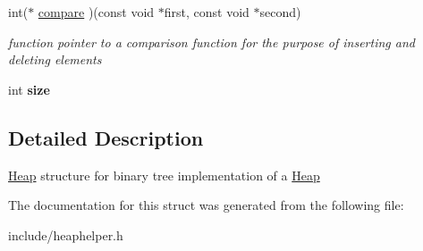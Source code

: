 \begin{DoxyCompactItemize}
\mbox{\label{structHeap_ab11468cee0bf82183a92cf2fa8bab107}} 
int($\ast$ \hyperlink{structHeap_ab11468cee0bf82183a92cf2fa8bab107}{compare} )(const void $\ast$first, const void $\ast$second)
\begin{DoxyCompactList}\small\item\em function pointer to a comparison function for the purpose of inserting and deleting elements \end{DoxyCompactList}\item 
\mbox{\label{structHeap_ac291cf589f86e95198621d33e21a05a6}} 
int {\bfseries size}
\end{DoxyCompactItemize}


\subsection{Detailed Description}
\hyperlink{structHeap}{Heap} structure for binary tree implementation of a \hyperlink{structHeap}{Heap} 

The documentation for this struct was generated from the following file\+:\begin{DoxyCompactItemize}
\item 
include/heaphelper.\+h\end{DoxyCompactItemize}
